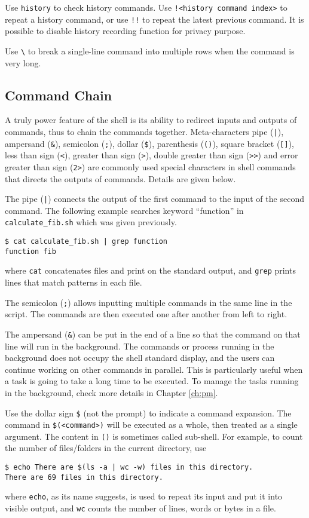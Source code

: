 Use \verb|history| to check history commands. Use \verb|!<history command index>| to repeat a history command, or use \verb|!!| to repeat the latest previous command. It is possible to disable history recording function for privacy purpose.

Use \verb|\| to break a single-line command into multiple rows when the command is very long.

\subsection{Command Chain}

A truly power feature of the shell is its ability to redirect inputs and outputs of commands, thus to chain the commands together. Meta-characters pipe (\verb?|?), ampersand (\verb|&|), semicolon (\verb|;|), dollar (\verb|$|), parenthesis (\verb|()|), square bracket (\verb|[]|), less than sign (\verb|<|), greater than sign (\verb|>|), double greater than sign (\verb|>>|) and error greater than sign (\verb|2>|) are commonly used special characters in shell commands that directs the outputs of commands. Details are given below.

The pipe (\verb$|$) connects the output of the first command to the input of the second command. The following example searches keyword ``function'' in \verb|calculate_fib.sh| which was given previously.
\begin{lstlisting}
$ cat calculate_fib.sh | grep function
function fib
\end{lstlisting}
where \verb|cat| concatenates files and print on the standard output, and \verb|grep| prints lines that match patterns in each file.

The semicolon (\verb|;|) allows inputting multiple commands in the same line in the script. The commands are then executed one after another from left to right.

The ampersand (\verb|&|) can be put in the end of a line so that the command on that line will run in the background. The commands or process running in the background does not occupy the shell standard display, and the users can continue working on other commands in parallel. This is particularly useful when a task is going to take a long time to be executed. To manage the tasks running in the background, check more details in Chapter \ref{ch:pm}.

Use the dollar sign \verb|$| (not the prompt) to indicate a command expansion. The command in \verb|$(<command>)| will be executed as a whole, then treated as a single argument. The content in \verb|()| is sometimes called sub-shell. For example, to count the number of files/folders in the current directory, use
\begin{lstlisting}
$ echo There are $(ls -a | wc -w) files in this directory.
There are 69 files in this directory.
\end{lstlisting}
where \verb|echo|, as its name suggests, is used to repeat its input and put it into visible output, and \verb|wc| counts the number of lines, words or bytes in a file.

